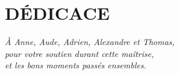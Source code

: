 \chapter*{DÉDICACE}\thispagestyle{headings}
\begin{flushright}
  \itshape
  À Anne, Aude, Adrien, Alexandre et Thomas,\\
  pour votre soutien durant cette maîtrise,\\
  et les bons moments passés ensembles.

\end{flushright}

